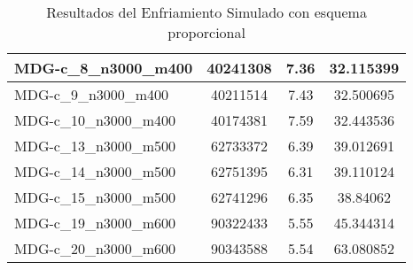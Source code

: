 \documentclass[11pt,a4paper]{article}
\begin{document}
\begin{table}[H]
\begin{center}
\begin{tabular}{|l|c|c|c|}
					MDG-c\_8\_n3000\_m400 & 40241308 & 7.36 & 32.115399 \\ \hline
					MDG-c\_9\_n3000\_m400 & 40211514 & 7.43 & 32.500695 \\ \hline
					MDG-c\_10\_n3000\_m400 & 40174381 & 7.59 & 32.443536 \\ \hline
					MDG-c\_13\_n3000\_m500 & 62733372 & 6.39 & 39.012691 \\ \hline
					MDG-c\_14\_n3000\_m500 & 62751395 & 6.31 & 39.110124 \\ \hline
					MDG-c\_15\_n3000\_m500 & 62741296 & 6.35 & 38.84062 \\ \hline
					MDG-c\_19\_n3000\_m600 & 90322433 & 5.55 & 45.344314 \\ \hline
					MDG-c\_20\_n3000\_m600 & 90343588 & 5.54 & 63.080852 \\ \hline
				\end{tabular}
				\caption{Resultados del Enfriamiento Simulado con esquema proporcional}
				\label{}
				\end{center}
			\end{table}
			
\end{document}
